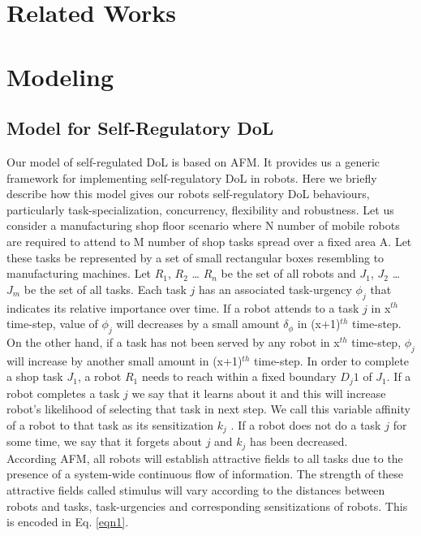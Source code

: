 \documentclass[letterpaper, 10 pt, conference]{ieeeconf}  %
\begin{document}
\section{Related Works}
\label{sec:bg}

\section{Modeling}
\label{sec:model}
\subsection{Model for Self-Regulatory DoL}
Our model of self-regulated DoL is based on AFM. It provides us a generic framework for implementing self-regulatory DoL in robots. Here we briefly describe how this model gives our robots self-regulatory DoL behaviours, particularly task-specialization, concurrency, flexibility and robustness.
Let us consider a manufacturing shop floor scenario where N number of mobile robots are required to attend to M number of shop tasks spread over a fixed area A. Let these tasks be represented by a set of small rectangular boxes resembling to manufacturing machines. Let $R_1$, $R_2$ … $R_n$ be the set of all robots and $J_1$, $J_2$ … $J_m$ be the set of all tasks. Each task $j$ has an associated task-urgency $\phi_j$ that indicates its relative importance over time. If a robot attends to a task $j$ in x$^{th}$ time-step, value of $\phi_j$ will decreases by a small amount $\delta_\phi$ in (x+1)$^{th}$ time-step. On the other hand, if a task has not been served by any robot in x$^{th}$ time-step,  $\phi_j$  will increase by another small amount in (x+1)$^{th}$ time-step. In order to complete a shop task $J_1$, a robot $R_1$ needs to reach within a fixed boundary $D_j1$ of $J_1$. If a robot completes a task $j$ we say that it learns about it and this will increase robot's likelihood of selecting that task in next step. We call this variable affinity of a robot to that task as its sensitization $k_j$ . If a robot does not do a task $j$ for some time, we say that it forgets about $j$ and $k_j$ has been decreased.\\
According AFM, all robots will establish attractive fields to all tasks due to the presence of a system-wide continuous flow of information. The strength of these attractive fields called stimulus will vary according to the distances between robots and tasks, task-urgencies and corresponding  sensitizations of robots. This is encoded in Eq. \ref{eqn1}.
\end{document}
